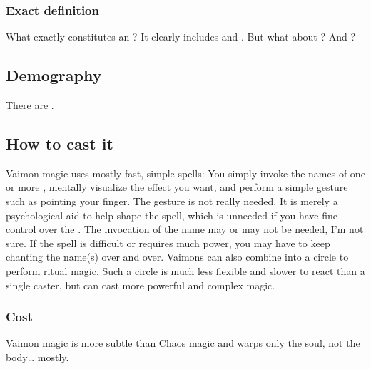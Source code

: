 \subsubsection{Exact definition}
What exactly constitutes an \Archon?
It clearly includes \sephiroth and \qliphoth.
But what about ? 
And \malachim?









\subsection{Demography}
There are . 









\subsection{How to cast it}
Vaimon magic uses mostly fast, simple  spells: 
You simply invoke the names of one or more \Archons, mentally visualize the effect you want, and perform a simple gesture such as pointing your finger. 
The gesture is not really needed. 
It is merely a psychological aid to help shape the spell, which is unneeded if you have fine control over the \Archons. 
The invocation of the name may or may not be needed, I'm not sure. If the spell is difficult or requires much power, you may have to keep chanting the name(s) over and over. 
Vaimons can also combine into a circle to perform ritual magic. Such a circle is much less flexible and slower to react than a single caster, but can cast more powerful and complex magic. 





\subsubsection{Cost}
Vaimon magic is more subtle than Chaos magic and warps only the soul, not the body\ldots{} mostly.

